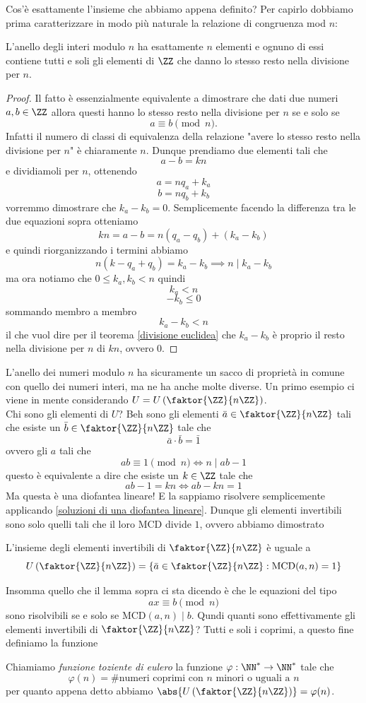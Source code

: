 \documentclass[11pt]{scrartcl}
\newcommand{\MCD}{\text{MCD}}
\begin{document}
	Cos'è esattamente l'insieme che abbiamo appena definito? Per capirlo dobbiamo prima caratterizzare in modo più naturale la relazione di congruenza mod $n$:
	\begin{proposition}
		L'anello degli interi modulo $n$ ha esattamente $n$ elementi e ognuno di essi contiene tutti e soli gli elementi di $\ZZ$ che danno lo stesso resto nella divisione per $n$.
	\end{proposition}
	\begin{proof}
		Il fatto è essenzialmente equivalente a dimostrare che dati due numeri $a,b\in\ZZ$ allora questi hanno lo stesso resto nella divisione per $n$ se e solo se 
		$$a\equiv b \pmod n.$$
		Infatti il numero di classi di equivalenza della relazione "avere lo stesso resto nella divisione per $n$" è chiaramente $n$. Dunque prendiamo due elementi tali che 
		$$a-b=kn$$
		e dividiamoli per $n$, ottenendo
		$$a=nq_a+k_a$$
		$$b=nq_b+k_b$$
		vorremmo dimostrare che $k_a-k_b=0$. Semplicemente facendo la differenza tra le due equazioni sopra otteniamo
		$$kn=a-b=n(q_a-q_b)+(k_a-k_b)$$
		e quindi riorganizzando i termini abbiamo
		$$n(k-q_a+q_b)=k_a-k_b \implies n\mid k_a-k_b$$
		ma ora notiamo che $0\le k_a,k_b<n$ quindi
		$$k_a<n$$
		$$-k_b\le0$$
		sommando membro a membro
		$$k_a-k_b<n$$ il che vuol dire per il teorema \ref{divisione euclidea} che $k_a-k_b$ è proprio il resto nella divisione per $n$ di $kn$, ovvero $0$.	
	\end{proof}
	L'anello dei numeri modulo $n$ ha sicuramente un sacco di proprietà in comune con quello dei numeri interi, ma ne ha anche molte diverse. Un primo esempio ci viene in mente considerando $U=U\left(\faktor{\ZZ}{n\ZZ}\right)$. \\
	Chi sono gli elementi di $U$? Beh sono gli elementi $\bar{a}\in\faktor{\ZZ}{n\ZZ}$ tali che esiste un $\bar{b}\in\faktor{\ZZ}{n\ZZ}$ tale che
	$$\bar{a}\cdot \bar{b}=\bar{1}$$
	ovvero gli $a$ tali che
	$$ab\equiv 1 \pmod n \iff n\mid ab-1$$
	questo è equivalente a dire che esiste un $k\in\ZZ$ tale che
	$$ab-1=kn \iff ab-kn=1$$
	Ma questa è una diofantea lineare! E la sappiamo risolvere semplicemente applicando \ref{soluzioni di una diofantea lineare}. Dunque gli elementi invertibili sono solo quelli tali che il loro MCD divide $1$, ovvero abbiamo dimostrato
	\begin{lemma}
		L'insieme degli elementi invertibili di $\faktor{\ZZ}{n\ZZ}$ è uguale a
		$$U\left(\faktor{\ZZ}{n\ZZ}\right)=\left\{\bar{a}\in\faktor{\ZZ}{n\ZZ}:\MCD(a,n)=1\right\}$$
	\end{lemma}
	 Insomma quello che il lemma sopra ci sta dicendo è che le equazioni del tipo 
	 $$ax\equiv b \pmod n$$
	 sono risolvibili se e solo se $\MCD(a,n)\mid b$. Qundi quanti sono effettivamente gli elementi invertibili di $\faktor{\ZZ}{n\ZZ}$? Tutti e soli i coprimi, a questo fine definiamo la funzione
	 \begin{definition}
	 	Chiamiamo \textit{funzione toziente di eulero} la funzione $\varphi:\NN^*\to\NN^*$ tale che
	 	$$\varphi(n)=\#\text{numeri coprimi con $n$ minori o uguali a $n$}$$
	 	per quanto appena detto abbiamo $\abs{U\left(\faktor{\ZZ}{n\ZZ}\right)}=\varphi(n)$.
	 \end{definition}
\end{document}

